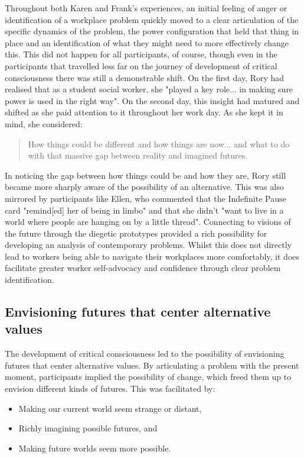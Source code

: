 Throughout both Karen and Frank's experiences, an initial feeling of anger or identification of a workplace problem quickly moved to a clear articulation of the specific dynamics of the problem, the power configuration that held that thing in place and an identification of what they might need to more effectively change this. This did not happen for all participants, of course, though even in the participants that travelled less far on the journey of development of critical consciousness there was still a demonstrable shift. On the first day, Rory had realised that as a student social worker, she "played a key role... in making sure power is used in the right way". On the second day, this insight had matured and shifted as she paid attention to it throughout her work day. As she kept it in mind, she considered:
\begin{quote}
How things could be different and how things are now... and what to do with that massive gap between reality and imagined futures. 
\end{quote}
In noticing the gap between how things could be and how they are, Rory still became more sharply aware of the possibility of an alternative. This was also mirrored by participants like Ellen, who commented that the Indefinite Pause card "remind[ed] her of being in limbo" and that she didn't "want to live in a world where people are hanging on by a little thread". Connecting to visions of the future through the diegetic prototypes provided a rich possibility for developing an analysis of contemporary problems. Whilst this does not directly lead to workers being able to navigate their workplaces more comfortably, it does facilitate greater worker self-advocacy and confidence through clear problem identification. 

\subsection{Envisioning futures that center alternative values}
The development of critical consciousness led to the possibility of envisioning futures that center alternative values. By articulating a problem with the present moment, participants implied the possibility of change, which freed them up to envision different kinds of futures. This was facilitated by:
\begin{itemize}
    \item Making our current world seem strange or distant,
    \item  Richly imagining possible futures, and
    \item  Making future worlds seem more possible.
\end{itemize}

